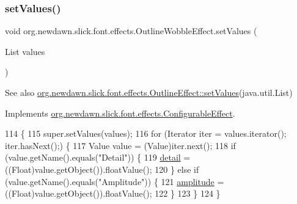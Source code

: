 \subsubsection{\texorpdfstring{set\+Values()}{setValues()}}
{\footnotesize\ttfamily void org.\+newdawn.\+slick.\+font.\+effects.\+Outline\+Wobble\+Effect.\+set\+Values (\begin{DoxyParamCaption}\item[{List}]{values }\end{DoxyParamCaption})\hspace{0.3cm}{\ttfamily [inline]}}

\begin{DoxySeeAlso}{See also}
\mbox{\hyperlink{classorg_1_1newdawn_1_1slick_1_1font_1_1effects_1_1_outline_effect_a02dbe78f6e87a036b850e35d3bbeb17c}{org.\+newdawn.\+slick.\+font.\+effects.\+Outline\+Effect\+::set\+Values}}(java.\+util.\+List) 
\end{DoxySeeAlso}


Implements \mbox{\hyperlink{interfaceorg_1_1newdawn_1_1slick_1_1font_1_1effects_1_1_configurable_effect_ac5e1cb43cb0c6b61753616dc746903a2}{org.\+newdawn.\+slick.\+font.\+effects.\+Configurable\+Effect}}.


\begin{DoxyCode}
114                                        \{
115         super.setValues(values);
116         \textcolor{keywordflow}{for} (Iterator iter = values.iterator(); iter.hasNext();) \{
117             Value value = (Value)iter.next();
118             \textcolor{keywordflow}{if} (value.getName().equals(\textcolor{stringliteral}{"Detail"})) \{
119                 \mbox{\hyperlink{classorg_1_1newdawn_1_1slick_1_1font_1_1effects_1_1_outline_wobble_effect_ac43d2a2c878ac5034bf82a0837cfa86f}{detail}} = ((Float)value.getObject()).floatValue();
120             \} \textcolor{keywordflow}{else} \textcolor{keywordflow}{if} (value.getName().equals(\textcolor{stringliteral}{"Amplitude"})) \{
121                 \mbox{\hyperlink{classorg_1_1newdawn_1_1slick_1_1font_1_1effects_1_1_outline_wobble_effect_a6797d66a3cfb14ca9b2e04bad9f2979e}{amplitude}} = ((Float)value.getObject()).floatValue();
122             \}
123         \}
124     \}
\end{DoxyCode}
\mbox{\label{classorg_1_1newdawn_1_1slick_1_1font_1_1effects_1_1_outline_wobble_effect_acfa57e45ee3bc578019939380763a1a4}} 
